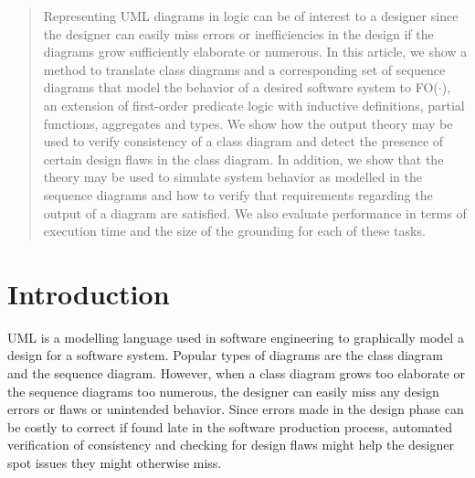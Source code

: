 \documentclass[conference]{IEEEtran}
\begin{document}
\begin{abstract}
Representing UML diagrams in logic can be of interest to a designer since the designer can easily miss errors or inefficiencies in the design if the diagrams grow sufficiently elaborate or numerous. In this article, we show a method to translate class diagrams and a corresponding set of sequence diagrams that model the behavior of a desired software system to FO($\cdot$), an extension of first-order predicate logic with inductive definitions, partial functions, aggregates and types. We show how the output theory may be used to verify consistency of a class diagram and detect the presence of certain design flaws in the class diagram. In addition, we show that the theory may be used to simulate system behavior as modelled in the sequence diagrams and how to verify that requirements regarding the output of a diagram are satisfied. We also evaluate performance in terms of execution time and the size of the grounding for each of these tasks.
\end{abstract}





%
\IEEEpeerreviewmaketitle



\section{Introduction}
UML\cite{RumbaughJames2005Tuml} is a modelling language used in software engineering to graphically model a design for a software system. Popular types of diagrams are the class diagram and the sequence diagram. However, when a class diagram grows too elaborate or the sequence diagrams too numerous, the designer can easily miss any design errors or flaws or unintended behavior. Since errors made in the design phase can be costly to correct if found late in the software production process, automated verification of consistency and checking for design flaws might help the designer spot issues they might otherwise miss.
\end{document}
